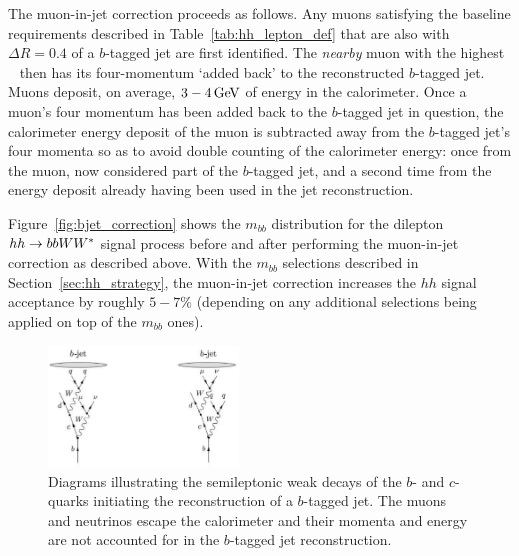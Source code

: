 The muon-in-jet correction proceeds as follows.
Any muons satisfying the baseline requirements described in Table~\ref{tab:hh_lepton_def} that
are also with $\Delta R = 0.4$ of a $b$-tagged jet are first identified.
The \textit{nearby} muon with the highest \pT~ then has its four-momentum `added back' to the reconstructed
$b$-tagged jet.
Muons deposit, on average, $3-4\,\text{Ge\kern -0.1em V}$ of energy in the calorimeter.
Once a muon's four momentum has been added back to the $b$-tagged jet in question, the calorimeter
energy deposit of the muon is subtracted away from the $b$-tagged jet's four momenta so as to avoid double
counting of the calorimeter energy: once from the muon, now considered part of the $b$-tagged jet, and a
second time from the energy deposit already having been used in the jet reconstruction.

Figure~\ref{fig:bjet_correction} shows the $m_{bb}$ distribution for the dilepton
$hh \rightarrow bbWW^*$ signal process before and after performing the muon-in-jet correction
as described above.
With the $m_{bb}$ selections described in Section~\ref{sec:hh_strategy}, the muon-in-jet
correction increases the $hh$ signal acceptance by roughly $5-7\%$ (depending on any additional
selections being applied on top of the $m_{bb}$ ones).

\begin{figure}[!htb]
    \begin{center}
        \includegraphics[width=0.45\textwidth]{figures/search_hh/bjet_semileptonic}
        \caption{
            Diagrams illustrating the semileptonic weak decays of the $b$- and $c$-quarks initiating the reconstruction
                of a $b$-tagged jet.
                The muons and neutrinos escape the calorimeter and their momenta and energy are not accounted
                for in the $b$-tagged jet reconstruction.
        }
        \label{fig:bjet_semileptonic}
    \end{center}
\end{figure}

